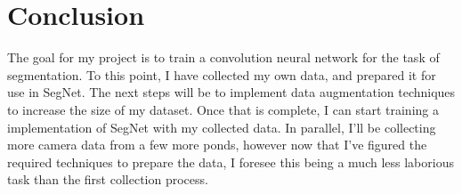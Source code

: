 \documentclass[10pt,twocolumn,letterpaper]{article}
\begin{document}

\section{Conclusion}
The goal for my project is to train a convolution neural network for the task of segmentation. To this point,
I have collected my own data, and prepared it for use in SegNet. The next steps will be to implement data augmentation techniques to increase the size of my dataset. Once that is complete, I can start training a
implementation of SegNet with my collected data. In parallel, I'll be collecting more camera data from a 
few more ponds, however now that I've figured the required techniques to prepare the data, I foresee this 
being a much less laborious task than the first collection process.


{\small


}
\end{document}
